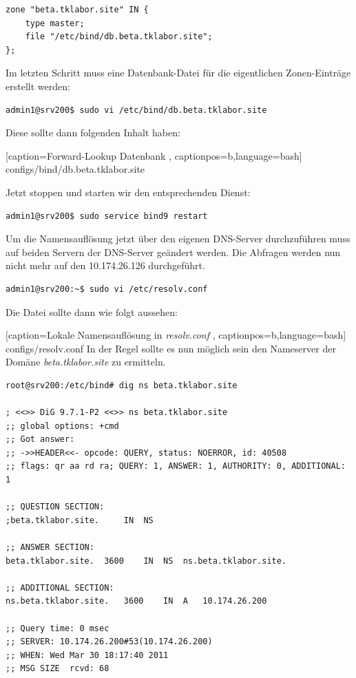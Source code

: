 \begin{scriptsize}
\begin{lstlisting}
zone "beta.tklabor.site" IN {
	type master;
	file "/etc/bind/db.beta.tklabor.site";
};
\end{lstlisting}
\end{scriptsize}

Im letzten Schritt muss eine Datenbank-Datei für die eigentlichen
Zonen-Einträge erstellt werden:

\begin{lstlisting}
admin1@srv200$ sudo vi /etc/bind/db.beta.tklabor.site
\end{lstlisting}

Diese sollte dann folgenden Inhalt haben:


    [caption={Forward-Lookup Datenbank}
       \label{lst:forware-zone-db},
       captionpos=b,language=bash]
{configs/bind/db.beta.tklabor.site}

Jetzt stoppen und starten wir den entsprechenden Dienst:
\begin{lstlisting}
admin1@srv200$ sudo service bind9 restart
\end{lstlisting}

Um die Namensauflösung jetzt über den eigenen DNS-Server durchzuführen muss auf
beiden Servern der DNS-Server geändert werden. Die Abfragen werden nun nicht
mehr auf den 10.174.26.126 durchgeführt.
\begin{lstlisting}
admin1@srv200:~$ sudo vi /etc/resolv.conf
\end{lstlisting}

Die Datei sollte dann wie folgt aussehen:

    [caption={Lokale Namensauflösung in \textit{resolv.conf}}
       \label{lst:resolv.conf},
       captionpos=b,language=bash]
{configs/resolv.conf}
In der Regel sollte es nun möglich sein den Nameserver der Domäne
\textit{beta.tklabor.site} zu ermitteln.

\begin{lstlisting}
root@srv200:/etc/bind# dig ns beta.tklabor.site

; <<>> DiG 9.7.1-P2 <<>> ns beta.tklabor.site
;; global options: +cmd
;; Got answer:
;; ->>HEADER<<- opcode: QUERY, status: NOERROR, id: 40508
;; flags: qr aa rd ra; QUERY: 1, ANSWER: 1, AUTHORITY: 0, ADDITIONAL: 1

;; QUESTION SECTION:
;beta.tklabor.site.		IN	NS

;; ANSWER SECTION:
beta.tklabor.site.	3600	IN	NS	ns.beta.tklabor.site.

;; ADDITIONAL SECTION:
ns.beta.tklabor.site.	3600	IN	A	10.174.26.200

;; Query time: 0 msec
;; SERVER: 10.174.26.200#53(10.174.26.200)
;; WHEN: Wed Mar 30 18:17:40 2011
;; MSG SIZE  rcvd: 68
\end{lstlisting}

